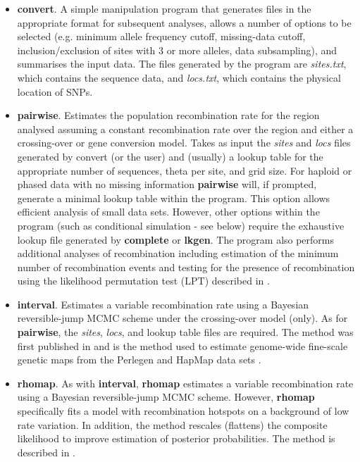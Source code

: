 \documentclass[a4paper,10pt,fullpage]{article}
\begin{document}
\begin{itemize}

\item {\bf convert}.  A simple manipulation program that
generates files in the appropriate format for subsequent analyses,
allows a number of options to be selected (e.g. minimum allele
frequency cutoff, missing-data cutoff, inclusion/exclusion of
sites with 3 or more alleles, data subsampling), and summarises
the input data. The files generated by the program are {\it
sites.txt}, which contains the sequence data, and {\it locs.txt}, which
contains the physical location of SNPs.

 \item {\bf pairwise}.  Estimates the population
recombination rate for the region analysed assuming a constant
recombination rate over the region and either a crossing-over or
gene conversion model. Takes as input the {\it sites} and {\it
locs} files generated by convert (or the user) and (usually) a
lookup table for the appropriate number of sequences, theta per
site, and grid size. For haploid or phased data with no missing
information {\bf pairwise} will, if prompted, generate a minimal
lookup table within the program. This option allows efficient
analysis of small data sets. However, other options within the
program (such as conditional simulation - see below) require the
exhaustive lookup file generated by {\bf complete} or {\bf lkgen}.  The program also performs additional analyses of recombination including estimation of the minimum number of recombination events and testing for the presence of recombination using the likelihood permutation test (LPT) described in \cite{McVeanetal02}.

 \item {\bf interval}.  Estimates a variable recombination rate
using a Bayesian reversible-jump MCMC scheme \cite{Green95} under
the crossing-over model (only).  As for {\bf pairwise}, the {\it
sites}, {\it locs}, and lookup table files are required.  The method was first published in \cite{McVeanetal04} and is the method used to estimate genome-wide fine-scale genetic maps from the Perlegen\cite{Myersetal05} and HapMap data sets \cite{HapMap05, HapMap07}.

\item {\bf rhomap}.  As with {\bf interval}, {\bf rhomap} estimates a variable recombination rate using a Bayesian reversible-jump MCMC scheme.  However, {\bf rhomap} specifically fits a model with recombination hotspots on a background of low rate variation.  In addition, the method rescales (flattens) the composite likelihood to improve estimation of posterior probabilities.  The method is described in \cite{AutonMcVean07}.


\end{itemize}
\end{document}
